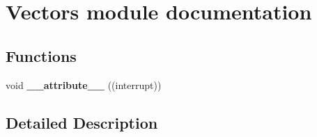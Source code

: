 \hypertarget{group___vectors__module}{}\section{Vectors module documentation}
\label{group___vectors__module}
\subsection*{Functions}
\begin{DoxyCompactItemize}
\item 
\hypertarget{group___vectors__module_ga445500277ba0e363873b34cffc015745}{}void {\bfseries \+\_\+\+\_\+attribute\+\_\+\+\_\+} ((interrupt))\label{group___vectors__module_ga445500277ba0e363873b34cffc015745}

\end{DoxyCompactItemize}


\subsection{Detailed Description}
